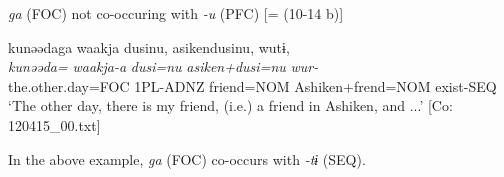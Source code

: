 \ea\label{ex:11-19}  \textit{ga} (FOC) not co-occuring with \textit{-u} (PFC) [= (10-14 b)]
  
      \glll    kunəədaga  waakja  dusinu,  asikendusinu,  wutɨ,\\
    \textit{kunəəda=}  \textit{waakja-a}  \textit{dusi=nu}  \textit{asiken+dusi=nu}  \textit{wur-}\\
    the.other.day=FOC  1PL-ADNZ  friend=NOM  Ashiken+frend=NOM  exist{}-SEQ\\
    \glt     ‘The other day, there is my friend, (i.e.) a friend in Ashiken, and ...’ [Co: 120415\_00.txt]
\z

In the above example, \textit{ga} (FOC) co-occurs with \textit{{}-tɨ} (SEQ).
